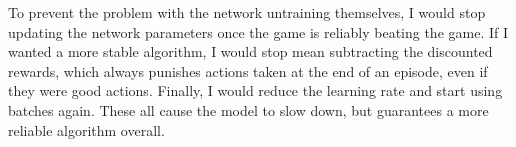 \documentclass[12pt,a4paper]{article}
\begin{document}
To prevent the problem with the network untraining themselves, I would stop updating the network parameters once the game is reliably beating the game. If I wanted a more stable algorithm, I would stop mean subtracting the discounted rewards, which always punishes actions taken at the end of an episode, even if they were good actions. Finally, I would reduce the learning rate and start using batches again. These all cause the model to slow down, but guarantees a more reliable algorithm overall.

%
%
\end{document}

